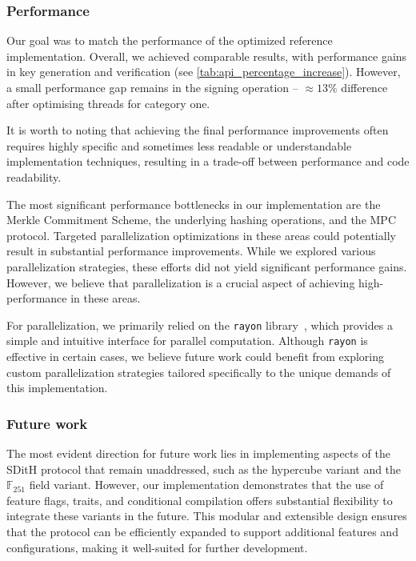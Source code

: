 \documentclass[11pt]{report}
\theoremstyle{definition}
\theoremstyle{plain}
\begin{document}
\subsubsection{Performance}

Our goal was to match the performance of the optimized reference implementation. Overall, we achieved comparable results, with performance gains in key generation and verification (see \autoref{tab:api_percentage_increase}). However, a small performance gap remains in the signing operation -- $\approx 13\%$ difference after optimising threads for category one.

It is worth to noting that achieving the final performance improvements often requires highly specific and sometimes less readable or understandable implementation techniques, resulting in a trade-off between performance and code readability.

The most significant performance bottlenecks in our implementation are the Merkle Commitment Scheme, the underlying hashing operations, and the MPC protocol. Targeted parallelization optimizations in these areas could potentially result in substantial performance improvements. While we explored various parallelization strategies, these efforts did not yield significant performance gains. However, we believe that parallelization is a crucial aspect of achieving high-performance in these areas.

For parallelization, we primarily relied on the \texttt{rayon} library~\cite{rayon}, which provides a simple and intuitive interface for parallel computation. Although \texttt{rayon} is effective in certain cases, we believe future work could benefit from exploring custom parallelization strategies tailored specifically to the unique demands of this implementation.

\subsubsection{Future work}

The most evident direction for future work lies in implementing aspects of the SDitH protocol that remain unaddressed, such as the hypercube variant and the $\mathbb{F}_{251}$ field variant. However, our implementation demonstrates that the use of feature flags, traits, and conditional compilation offers substantial flexibility to integrate these variants in the future. This modular and extensible design ensures that the protocol can be efficiently expanded to support additional features and configurations, making it well-suited for further development.
\end{document}
